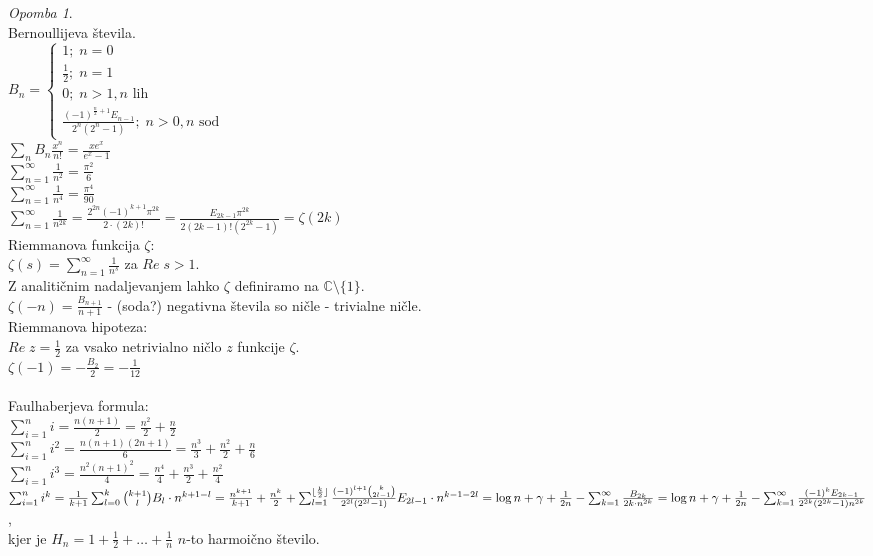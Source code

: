 \documentclass[a4paper, 12pt]{book}
\theoremstyle{definition}
\theoremstyle{remark}
\newtheorem*{rem}{Opomba}
\newcommand{\C}{\mathbb{C}}
\begin{document}
\begin{rem} \text{} \\
  Bernoullijeva števila. \\
  $B_n = \begin{cases}
    1; \; n = 0 \\
    \frac{1}{2}; \; n = 1 \\
    0; \; n > 1, n \text{ lih} \\
    \frac{(-1)^{\frac{n}{2} + 1} E_{n-1}}{2^n (2^n - 1)}; \; n > 0, n \text{ sod}
  \end{cases}$ \\
  $\sum_n B_n \frac{x^n}{n!} = \frac{x e^x}{e^x - 1}$ \\
  $\sum_{n=1}^{\infty} \frac{1}{n^2} = \frac{\pi^2}{6}$ \\
  $\sum_{n=1}^{\infty} \frac{1}{n^4} = \frac{\pi^4}{90}$ \\
  $\sum_{n=1}^{\infty} \frac{1}{n^{2k}} = \frac{2^{2n} (-1)^{k+1} \pi^{2k}}{2 \cdot (2k)!}
  = \frac{E_{2k-1} \pi^{2k}}{2 (2k-1)! (2^{2k}-1)} = \zeta(2k)$ \\
  Riemmanova funkcija $\zeta$: \\
  $\zeta(s) = \sum_{n=1}^{\infty} \frac{1}{n^s}$ za $Re \; s > 1$. \\
  Z analitičnim nadaljevanjem lahko $\zeta$ definiramo na $\C \setminus \{1\}$. \\
  $\zeta(-n) = \frac{B_{n+1}}{n+1}$ - (soda?) negativna števila so ničle - trivialne ničle. \\
  Riemmanova hipoteza: \\
  $Re \; z = \frac{1}{2}$ za vsako netrivialno ničlo $z$ funkcije $\zeta$. \\
  $\zeta(-1) = -\frac{B_2}{2} = -\frac{1}{12}$ \\
   \\
  Faulhaberjeva formula: \\
  $\sum_{i=1}^{n} i = \frac{n (n+1)}{2} = \frac{n^2}{2} + \frac{n}{2}$ \\
  $\sum_{i=1}^{n} i^2 = \frac{n (n+1) (2n+1)}{6} = \frac{n^3}{3} + \frac{n^2}{2} + \frac{n}{6}$ \\
  $\sum_{i=1}^{n} i^3 = \frac{n^2 (n+1)^2}{4} = \frac{n^4}{4} + \frac{n^3}{2} + \frac{n^2}{4}$ \\
  $\sum_{i=1}^{n} i^k = \frac{1}{k+1} \sum_{l=0}^{k} \binom{k+1}{l} B_l \cdot n^{k+1-l} \\
  = \frac{n^{k+1}}{k+1} + \frac{n^k}{2} + \sum_{l=1}^{\lfloor\frac{k}{2}\rfloor}
  \frac{(-1)^{l+1} \binom{k}{2l-1}}{2^{2l} (2^{2l}-1)} E_{2l-1} \cdot n^{k-1-2l} \\
  = \log n + \gamma + \frac{1}{2n} - \sum_{k=1}^{\infty} \frac{B_{2k}}{2k \cdot n^{2k}} \\
  = \log n + \gamma + \frac{1}{2n} - \sum_{k=1}^{\infty} \frac{(-1)^k E_{2k-1}}{2^{2k} (2^{2k} - 1) n^{2k}}$, \\
  kjer je $H_n = 1 + \frac{1}{2} + \dots + \frac{1}{n}$ $n$-to harmoično število.
\end{rem}
\end{document}
